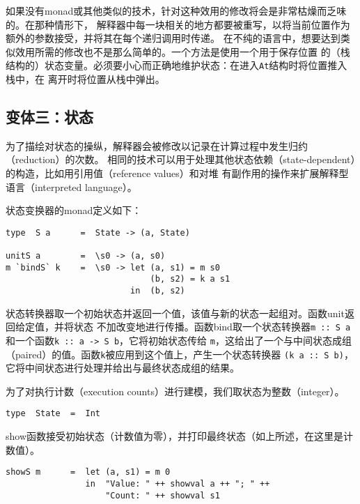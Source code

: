 \documentclass[12pt]{article}
\begin{document}
\indent{}如果没有monad或其他类似的技术，针对这种效用的修改将会是非常枯燥而乏味的。在那种情形下，
解释器中每一块相关的地方都要被重写，以将当前位置作为额外的参数接受，并将其在每个递归调用时传递。
在不纯的语言中，想要达到类似效用所需的修改也不是那么简单的。一个方法是使用一个用于保存位置
的（栈结构的）状态变量。必须要小心而正确地维护状态：在进入\texttt{At}结构时将位置推入栈中，在
离开时将位置从栈中弹出。

\subsection{变体三：状态}\label{sec:variation_state}
\indent{}为了描绘对状态的操纵，解释器会被修改以记录在计算过程中发生归约（reduction）的次数。
相同的技术可以用于处理其他状态依赖（state-dependent）的构造，比如用引用值（reference values）和对堆
有副作用的操作来扩展解释型语言（interpreted language）。

\indent{}状态变换器的monad定义如下：
\begin{verbatim}
type  S a      =  State -> (a, State)

unitS a        =  \s0 -> (a, s0)
m `bindS` k    =  \s0 -> let (a, s1) = m s0
                             (b, s2) = k a s1
                         in  (b, s2)
\end{verbatim}

\indent{}状态转换器取一个初始状态并返回一个值，该值与新的状态一起组对。函数unit返回给定值，并将状态
不加改变地进行传播。函数bind取一个状态转换器\texttt{m :: S a}和一个函数\texttt{k :: a -> S b}，它将初始状态传给
\texttt{m}，这给出了一个与中间状态成组（paired）的值。函数\texttt{k}被应用到这个值上，产生一个状态转换器
\texttt{(k a :: S b)}，它将中间状态进行处理并给出与最终状态成组的结果。

\indent{}为了对执行计数（execution counts）进行建模，我们取状态为整数（integer）。
\begin{verbatim}
type  State  =  Int
\end{verbatim}

\indent{}show函数接受初始状态（计数值为零），并打印最终状态（如上所述，在这里是计数值）。
\begin{verbatim}
showS m      =  let (a, s1) = m 0
                in  "Value: " ++ showval a ++ "; " ++
                    "Count: " ++ showval s1
\end{verbatim}
\end{document}
